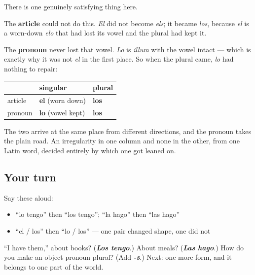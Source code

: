 \begin{cousinweb}
There is one genuinely satisfying thing here.

The \textbf{article} could not do this. \emph{El} did not become \emph{els}; it became \emph{los}, because \emph{el} is a worn-down \emph{elo} that had lost its vowel and the plural had kept it.

The \textbf{pronoun} never lost that vowel. \emph{Lo} is \emph{illum} with the vowel intact — which is exactly why it was not \emph{el} in the first place. So when the plural came, \emph{lo} had nothing to repair:

\noindent
\begin{tabularx}{\linewidth}{@{}>{\raggedright\arraybackslash}X>{\raggedright\arraybackslash}X>{\raggedright\arraybackslash}X@{}}
\toprule
\textbf{} & \textbf{singular} & \textbf{plural} \\
\midrule
article & \textbf{el} (worn down) & \textbf{los} \\
pronoun & \textbf{lo} (vowel kept) & \textbf{los} \\
\bottomrule
\end{tabularx}

The two arrive at the same place from different directions, and the pronoun takes the plain road. An irregularity in one column and none in the other, from one Latin word, decided entirely by which one got leaned on.
\end{cousinweb}

\subsection*{Your turn}
Say these aloud:

\begin{itemize}
\raggedright
  \item \textquotedblleft{}lo tengo\textquotedblright{} then \textquotedblleft{}los tengo\textquotedblright{}; \textquotedblleft{}la hago\textquotedblright{} then \textquotedblleft{}las hago\textquotedblright{}
  \item \textquotedblleft{}el / los\textquotedblright{} then \textquotedblleft{}lo / los\textquotedblright{} — one pair changed shape, one did not
\end{itemize}

\begin{tcolorbox}[breakable,colback=teal!4,colframe=teal!35!black,title={Before you move on}]
\textquotedblleft{}I have them,\textquotedblright{} about books? (\emph{\textbf{Los tengo}}.) About meals? (\emph{\textbf{Las hago}}.) How do you make an object pronoun plural? (Add \emph{\textbf{-s}}.) Next: one more form, and it belongs to one part of the world.
\end{tcolorbox}
